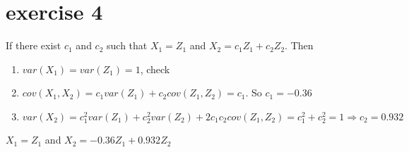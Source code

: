 \documentclass{article}
\begin{document}
\section{exercise 4}
If there exist $c_1$ and $c_2$ such that $X_1 = Z_1$ and $X_2 = c_1 Z_1 + c_2 Z_2$. Then
\begin{enumerate}
    \item $var(X_1) = var(Z_1) = 1$, check
    \item $cov(X_1, X_2) = c_1 var(Z_1) + c_2 cov(Z_1, Z_2) = c_1$. So ${c_1 = -0.36}$
    \item $var(X_2) = c_1^2 var(Z_1) + c_2^2 var(Z_2) + 2c_1 c_2 cov(Z_1, Z_2) = c_1^2 + c_2^2 = 1 \Rightarrow{c_2 = 0.932}$
\end{enumerate}
$\boxed{X_1 = Z_1}$ and $\boxed{X_2 = -0.36 Z_1 + 0.932 Z_2}$
\end{document}
